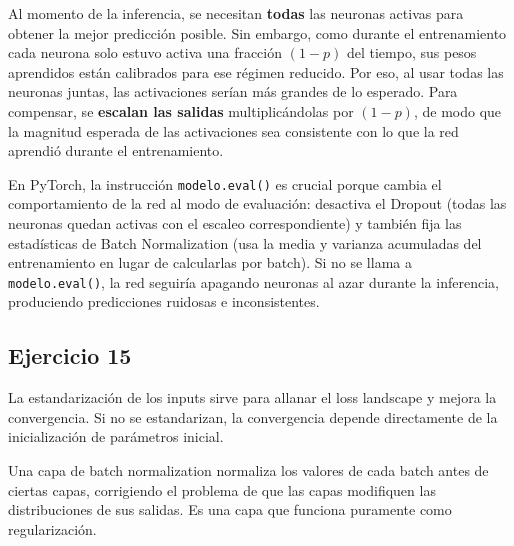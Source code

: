 \documentclass[a4paper,11pt]{article}
\begin{document}
Al momento de la inferencia, se necesitan \textbf{todas} las neuronas activas para obtener la mejor predicción posible. Sin embargo, como durante el entrenamiento cada neurona solo estuvo activa una fracción $(1-p)$ del tiempo, sus pesos aprendidos están calibrados para ese régimen reducido. Por eso, al usar todas las neuronas juntas, las activaciones serían más grandes de lo esperado. Para compensar, se \textbf{escalan las salidas} multiplicándolas por $(1-p)$, de modo que la magnitud esperada de las activaciones sea consistente con lo que la red aprendió durante el entrenamiento.

En PyTorch, la instrucción \texttt{modelo.eval()} es crucial porque cambia el comportamiento de la red al modo de evaluación: desactiva el Dropout (todas las neuronas quedan activas con el escaleo correspondiente) y también fija las estadísticas de Batch Normalization (usa la media y varianza acumuladas del entrenamiento en lugar de calcularlas por batch). Si no se llama a \texttt{modelo.eval()}, la red seguiría apagando neuronas al azar durante la inferencia, produciendo predicciones ruidosas e inconsistentes.
\subsection*{Ejercicio 15}
La estandarización de los inputs sirve para allanar el loss landscape y mejora la convergencia. Si no se estandarizan, la convergencia depende directamente de la inicialización de parámetros inicial.

Una capa de batch normalization normaliza los valores de cada batch antes de ciertas capas, corrigiendo el problema de que las capas modifiquen las distribuciones de sus salidas. Es una capa que funciona puramente como regularización.
\end{document}
